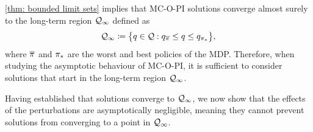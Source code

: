 


\vspace{-0.4cm}

\autoref{thm: bounded limit sets} implies that MC-O-PI solutions converge almost surely to the long-term region $\mathcal{Q}_\infty$ defined as
\begin{align}
\label{eq: long term region}
    \mathcal{Q}_\infty \coloneqq \big\{ q \in \mathcal{Q} : q_{\overline{\pi}} \leq q \leq q_{{\pi}_*} \big\} ,
\end{align}
where $\overline{\pi}$ and ${\pi}_*$ are the worst and best policies of the MDP.
Therefore, when studying the asymptotic behaviour of MC-O-PI, it is sufficient to consider solutions that start in the long-term region $\mathcal{Q}_\infty$.

% 



Having established that solutions converge to $\mathcal{Q}_\infty$, we now show that the effects of the perturbations are asymptotically negligible, meaning they cannot prevent solutions from converging to a point in $\mathcal{Q}_\infty$.






